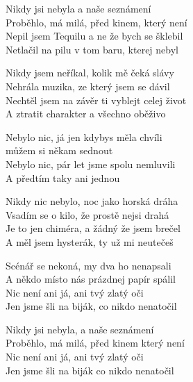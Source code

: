 
\ve{}
Nikdy jsi nebyla a naše seznámení\\
Proběhlo, má milá, před kinem, který není\\
Nepil jsem Tequilu a ne že bych se šklebil\\
Netlačil na pilu v tom baru, kterej nebyl

\ve{}
Nikdy jsem neříkal, kolik mě čeká slávy\\
Nehrála muzika, ze který jsem se dávil\\
Nechtěl jsem na závěr ti vyblejt celej život\\
A ztratit charakter a všechno oběživo

\cho{}
Nebylo nic, já jen kdybys měla chvíli\\
můžem si někam sednout\\
Nebylo nic, pár let jsme spolu nemluvili\\
A předtím taky ani jednou

\ve{}
Nikdy nic nebylo, noc jako horská dráha\\
Vsadím se o kilo, že prostě nejsi drahá\\
Je to jen chiméra, a žádný že jsem brečel\\
A měl jsem hysterák, ty už mi neutečeš

\ve{}
Scénář se nekoná, my dva ho nenapsali\\
A někdo místo nás prázdnej papír spálil\\
Nic není ani já, ani tvý zlatý oči\\
Jen jsme šli na biják, co nikdo nenatočil

\cho{}

\ve{}
Nikdy jsi nebyla, a naše seznámení\\
Proběhlo, má milá, před kinem který není\\
Nic není ani já, ani tvý zlatý oči\\
Jen jsme šli na biják co nikdo nenatočil

\cho{}

\esong
